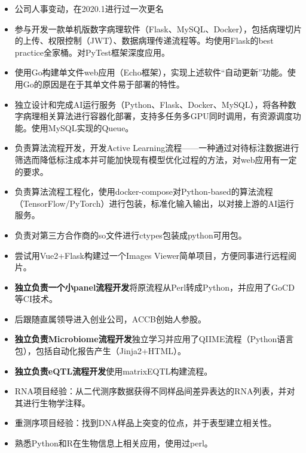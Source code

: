 \documentclass{resume}
\begin{document}
\begin{itemize}
  \item 公司人事变动，在2020.1进行过一次更名
  \item 参与开发一款单机版数字病理软件（Flask、MySQL、Docker），包括病理切片的上传、权限控制（JWT）、数据病理传递流程等。均使用Flask的best practice全家桶。对PyTest框架深度应用。
  \item 使用Go构建单文件web应用（Echo框架），实现上述软件“自动更新”功能。使用Go的原因是在于其单文件易于部署的特性。
  \item 独立设计和完成AI运行服务（Python、Flask、Docker、MySQL），将各种数字病理相关算法进行容器化部署，支持多任务多GPU同时调用，有资源调度功能。使用MySQL实现的Queue。
  \item 负责算法流程开发，开发Active Learning流程——一种通过对待标注数据进行筛选而降低标注成本并可能加快现有模型优化过程的方法，对web应用有一定的要求。
  \item 负责算法流程工程化，使用docker-compose对Python-based的算法流程（TensorFlow/PyTorch）进行包装，标准化输入输出，以对接上游的AI运行服务。
  \item 负责对第三方合作商的so文件进行ctypes包装成python可用包。
  \item 尝试用Vue2+Flask构建过一个Images Viewer简单项目，方便同事进行远程阅片。
\end{itemize}

\begin{itemize}
  \item \textbf{独立负责一个小panel流程开发}将原流程从Perl转成Python，并应用了GoCD等CI技术。
  \item 后跟随直属领导进入创业公司，ACCB创始人参股。
\end{itemize}

\begin{itemize}
  \item \textbf{独立负责Microbiome流程开发}独立学习并应用了QIIME流程（Python语言包），包括自动化报告产生（Jinja2+HTML）。
\end{itemize}

\begin{itemize}
  \item \textbf{独立负责eQTL流程开发}使用matrixEQTL构建流程。
  \item RNA项目经验：从二代测序数据获得不同样品间差异表达的RNA列表，并对其进行生物学注释。
  \item 重测序项目经验：找到DNA样品上突变的位点，并于表型建立相关性。
  \item 熟悉Python和R在生物信息上相关应用，使用过perl。
\end{itemize}
\end{document}
